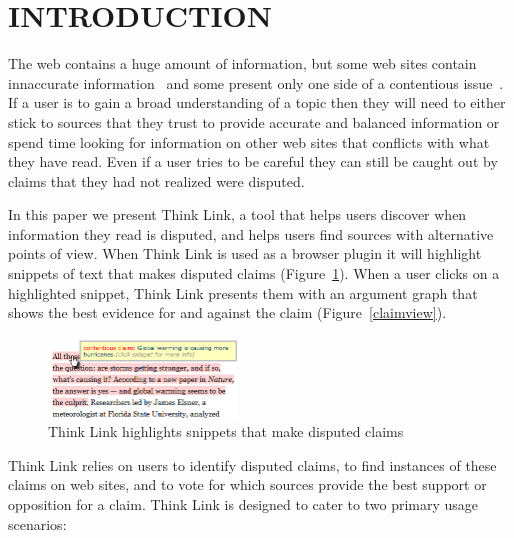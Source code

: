 \documentclass{chi2009}
\newcommand{\todo}[1]{}
\begin{document}




\section{INTRODUCTION}

\todo{update screenshots}

The web contains a huge amount of information, but some web sites contain innaccurate information~\cite{Mintz2002,Neumann2003,Resnik1998,Zhou2004} and some present only one side of a contentious issue~\cite{Herman2002,Gentzkow2007}. 
If a user is to gain a broad understanding of a topic then they will need to either stick to sources that they trust to provide accurate and balanced information or spend time looking for information on other web sites that conflicts with what they have read. 
Even if a user tries to be careful they can still be caught out by claims that they had not realized were disputed.
\todo{word this better}\todo{update all screenshots}

In this paper we present Think Link, a tool that helps users discover when information they read is disputed, and helps users find sources with alternative points of view. When Think Link is used as a browser plugin it will highlight snippets of text that makes disputed claims (Figure~\ref{highlight}). When a user clicks on a highlighted snippet, Think Link presents them with an argument graph that shows the best evidence for and against the claim (Figure~\ref{claimview}). 

\begin{figure}[tb]
	\begin{center}
	\includegraphics[width=5cm]{../screenshots/highlight_crop.png}
	\caption{Think Link highlights snippets that make disputed claims}
	\label{highlight}
	\end{center}
\end{figure}

Think Link relies on users to identify disputed claims, to find instances of these claims on web sites, and to vote for which sources provide the best support or opposition for a claim. 
Think Link is designed to cater to two primary usage scenarios:
\end{document}
